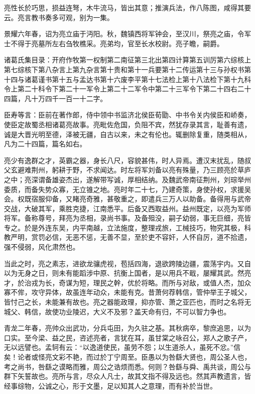 \documentclass[12pt,UTF8]{ctexbook}
\begin{document}
亮性长於巧思，损益连弩，木牛流马，皆出其意；推演兵法，作八陈图，咸得其要云。亮言教书奏多可观，别为一集。

景耀六年春，诏为亮立庙于沔阳。秋，魏镇西将军钟会，至汉川，祭亮之庙，令军士不得于亮墓所左右刍牧樵采。亮弟均，官至长水校尉。亮子瞻，嗣爵。

诸葛氏集目录：开府作牧第一权制第二南征第三北出第四计算第五训厉第六综核上第七综核下第八杂言上第九杂言第十贵和第十一兵要第十二传运第十三与孙权书第十四与诸葛谨书第十五与孟达书第十六废李平第十七法检上第十八法检下第十九科令上第二十科令下第二十一军令上第二十二军令中第二十三军令下第二十四右二十四篇，凡十万四千一百一十二字。

臣寿等言：臣前在著作郎，侍中领中书监济北侯臣荀勖、中书令关内侯臣和峤奏，使臣定故蜀丞相诸葛亮故事。亮毗佐危国，负阻不宾，然犹存录其言，耻善有遗，诚是大晋光明至德，泽被无疆，自古以来，未之有伦也。辄删除复重，随类相从，凡为二十四篇，篇名如右。

亮少有逸群之才，英霸之器，身长八尺，容貌甚伟，时人异焉。遭汉末扰乱，随叔父玄避难荆州，躬耕于野，不求闻达。时左将军刘备以亮有殊量，乃三顾亮於草庐之中；亮深谓备雄姿杰出，遂解带写诚，厚相结纳。及魏武帝南征荆州，刘琮举州委质，而备失势众寡，无立锥之地。亮时年二十七，乃建奇策，身使孙权，求援吴会。权既宿服仰备，又睹亮奇雅，甚敬重之，即遣兵三万人以助备。备得用与武帝交战，大破其军，乘胜克捷，江南悉平。后备又西取益州。益州既定，以亮为军师将军。备称尊号，拜亮为丞相，录尚书事。及备殂没，嗣子幼弱，事无巨细，亮皆专之。於是外连东吴，内平南越，立法施度，整理戎旅，工械技巧，物究其极，科教严明，赏罚必信，无恶不惩，无善不显，至於吏不容奸，人怀自厉，道不拾遗，强不侵弱，风化肃然也。

当此之时，亮之素志，进欲龙骧虎视，苞括四海，退欲跨陵边疆，震荡宇内。又自以为无身之日，则未有能蹈涉中原、抗衡上国者，是以用兵不戢，屡耀其武。然亮才，於治戎为长，奇谋为短，理民之幹，优於将略。而所与对敌，或值人杰，加众寡不侔，攻守异体，故虽连年动众，未能有克。昔萧何荐韩信，管仲举王子城父，皆忖己之长，未能兼有故也。亮之器能政理，抑亦管、萧之亚匹也，而时之名将无城父、韩信，故使功业陵迟，大义不及邪？盖天命有归，不可以智力争也。

青龙二年春，亮帅众出武功，分兵屯田，为久驻之基。其秋病卒，黎庶追思，以为口实。至今梁、益之民，咨述亮者，言犹在耳，虽甘棠之咏召公，郑人之歌子产，无以远譬也。孟轲有云：“以逸道使民，虽劳不怨；以生道杀人，虽死不忿。”信矣！论者或怪亮文彩不艳，而过於丁宁周至。臣愚以为咎繇大贤也，周公圣人也，考之尚书，咎繇之谟略而雅，周公之诰烦而悉。何则？咎繇与舜、禹共谈，周公与群下矢誓故也。亮所与言，尽众人凡士，故其文指不得及远也。然其声教遗言，皆经事综物，公诚之心，形于文墨，足以知其人之意理，而有补於当世。
\end{document}
